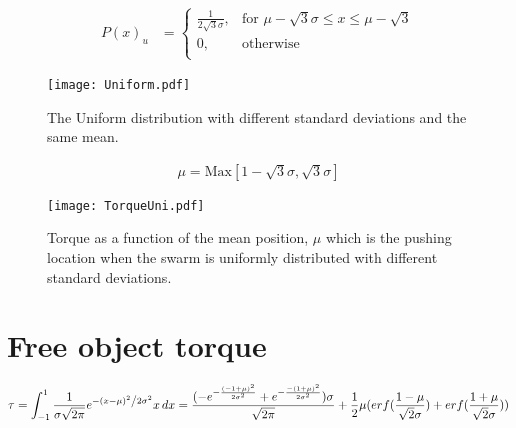\begin{align}
P(x)_{u} &=  \left\{
\begin{array}{ll}
    \frac{1}{2\sqrt{3}\sigma}, &  \textrm{for   } \mu-\sqrt{3}\sigma \leq x \leq \mu-\sqrt{3}\\
     0, & \textrm{otherwise}\\
\end{array} 
\right.
\end{align}
\newpage
\begin{figure}
\begin{center}
	\texttt{[image: Uniform.pdf]}
\end{center}
\caption{\label{fig:pdfUni}
The Uniform distribution with different standard deviations and the same mean.
}
\vspace{-1em}
\end{figure}
\begin{align}
\mu = \textrm{Max}[1-\sqrt{3}\sigma,\sqrt{3}\sigma]
\end{align}
\begin{figure}
\begin{center}
	\texttt{[image: TorqueUni.pdf]}
\end{center}
\vspace{-1em}
\caption{\label{fig:torqueUni}
Torque as a function of the mean position, $\mu$ which is the pushing location when the swarm is uniformly distributed with different standard deviations.
}
\vspace{-1em}
\end{figure}


\newpage

\section{Free object torque}

\begin{strip}
\begin{align} \nonumber
\tau = \int_{-1}^1\frac{1}{{\sigma \sqrt {2\pi } }}e^{{{ - \left( {x - \mu } \right)^2 } \mathord{\left/ {\vphantom {{ - \left( {x - \mu } \right)^2 } {2\sigma ^2 }}} \right. \kern-\nulldelimiterspace} {2\sigma ^2 }}} x \, dx = \frac{(-e^{-\frac{(-1+\mu)^2}{2\sigma^2}}+e^{-\frac{-(1+\mu)^2}{2\sigma^2}})\sigma}{\sqrt{2\pi}}+ \frac{1}{2}\mu(erf(\frac{1-\mu}{\sqrt{2}\sigma})+erf(\frac{1+\mu}{\sqrt{2}\sigma})) 
\end{align}
\end{strip}


